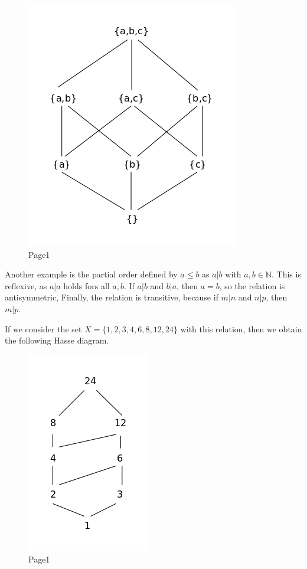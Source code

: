 \begin{figure}
\centering
\includegraphics{images/lattices_01_1.png}
\caption{Page1}
\end{figure}

Another example is the partial order defined by \(a \leq b\) as
\(a | b\) with \(a,b \in \mathbb{N}\). This is reflexive, as \(a | a\)
holds fors all \(a,b\). If \(a|b\) and \(b|a\), then \(a=b\), so the
relation is antisymmetric, Finally, the relation is transitive, because
if \(m|n\) and \(n|p\), then \(m|p\).

If we consider the set \(X=\{1,2,3,4,6,8,12,24\}\) with this relation,
then we obtain the following Hasse diagram.

\begin{figure}
\centering
\includegraphics{images/lattices_01_2.png}
\caption{Page1}
\end{figure}
